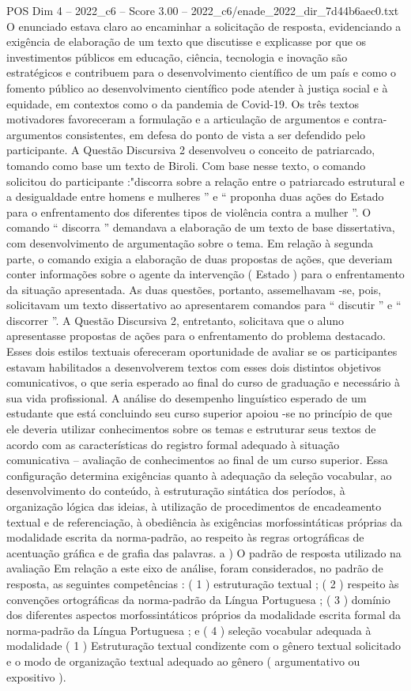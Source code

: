 \begin{textsample}{POS Dim 4 – 2022\_c6 – Score 3.00 – 2022\_c6/enade\_2022\_dir\_7d44b6aec0.txt}
O enunciado estava claro ao encaminhar a solicitação de resposta, evidenciando a exigência de elaboração de um texto que discutisse e explicasse por que os investimentos públicos em educação, ciência, tecnologia e inovação são estratégicos e contribuem para o desenvolvimento científico de um país e como o fomento público ao desenvolvimento científico pode atender à justiça social e à equidade, em contextos como o da pandemia de Covid-19.
Os três textos motivadores favoreceram a formulação e a articulação de argumentos e contra-argumentos consistentes, em defesa do ponto de vista a ser defendido pelo participante.
A Questão Discursiva 2 desenvolveu o conceito de patriarcado, tomando como base um texto de Biroli.
Com base nesse texto, o comando solicitou do participante :"discorra sobre a relação entre o patriarcado estrutural e a desigualdade entre homens e mulheres ” e “ proponha duas ações do Estado para o enfrentamento dos diferentes tipos de violência contra a mulher ”.
O comando “ discorra ” demandava a elaboração de um texto de base dissertativa, com desenvolvimento de argumentação sobre o tema.
Em relação à segunda parte, o comando exigia a elaboração de duas propostas de ações, que deveriam conter informações sobre o agente da intervenção ( Estado ) para o enfrentamento da situação apresentada.
As duas questões, portanto, assemelhavam -se, pois, solicitavam um texto dissertativo ao apresentarem comandos para “ discutir ” e “ discorrer ”.
A Questão Discursiva 2, entretanto, solicitava que o aluno apresentasse propostas de ações para o enfrentamento do problema destacado.
Esses dois estilos textuais ofereceram oportunidade de avaliar se os participantes estavam habilitados a desenvolverem textos com esses dois distintos objetivos comunicativos, o que seria esperado ao final do curso de graduação e necessário à sua vida profissional.
A análise do desempenho linguístico esperado de um estudante que está concluindo seu curso superior apoiou -se no princípio de que ele deveria utilizar conhecimentos sobre os temas e estruturar seus textos de acordo com as características do registro formal adequado à situação comunicativa – avaliação de conhecimentos ao final de um curso superior.
Essa configuração determina exigências quanto à adequação da seleção vocabular, ao desenvolvimento do conteúdo, à estruturação sintática dos períodos, à organização lógica das ideias, à utilização de procedimentos de encadeamento textual e de referenciação, à obediência às exigências morfossintáticas próprias da modalidade escrita da norma-padrão, ao respeito às regras ortográficas de acentuação gráfica e de grafia das palavras. a ) O padrão de resposta utilizado na avaliação Em relação a este eixo de análise, foram considerados, no padrão de resposta, as seguintes competências : ( 1 ) estruturação textual ; ( 2 ) respeito às convenções ortográficas da norma-padrão da Língua Portuguesa ; ( 3 ) domínio dos diferentes aspectos morfossintáticos próprios da modalidade escrita formal da norma-padrão da Língua Portuguesa ; e ( 4 ) seleção vocabular adequada à modalidade ( 1 ) Estruturação textual condizente com o gênero textual solicitado e o modo de organização textual adequado ao gênero ( argumentativo ou expositivo ).

\end{textsample}
